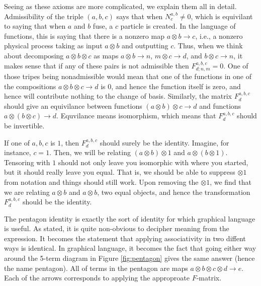 \documentclass{article}
\theoremstyle{definition}
\numberwithin{figure}{section}
\begin{document}
Seeing as these axioms are more complicated, we explain them all in detail. Admissibility of the triple $(a,b,c)$ says that when $N^{a,b}_{c}\neq 0$, which is equivilant to saying that when $a$ and $b$ fuse, a $c$ particle is created. In the language of functions, this is saying that there is a nonzero map $a\otimes b\to c$, i.e., a nonzero physical process taking as input $a\otimes b$ and outputting $c$.  Thus, when we think about decomposing $a\otimes b\otimes c$ as maps $a\otimes b\to n$, $m\otimes c\to d$, and $b\otimes c\to n$, it makes sense that if any of these pairs is not admissible then $F^{a,b,c}_{d;n,m}=0$. One of those tripes being nonadmissible would mean that one of the functions in one of the compositions $a\otimes b\otimes c\to d$ is $0$, and hence the function itself is zero, and hence will contribute nothing to the change of basis. Similarly, the matrix $F^{a,b,c}_{d}$ should give an equivilance between functions $(a\otimes b)\otimes c \to d$ and functions $a\otimes (b\otimes c)\to d$. Equvilance means isomorphism, which means that $F^{a,b,c}_{d}$ should be invertible.

If one of $a,b,c$ is $1$, then $F^{a,b,c}_{d}$ should surely be the identity. Imagine, for instance, $c=1$. Then, we will be relating $(a\otimes b)\otimes 1$ and $a \otimes (b\otimes 1)$. Tensoring with $1$ should not only leave you isomorphic with where you started, but it should really leave you equal. That is, we should be able to suppress $\otimes 1$ from notation and things should still work. Upon removing the $\otimes 1$, we find that we are relating $a\otimes b$ and $a\otimes b$, two equal objects, and hence the transformation $F^{a,b,c}_{d}$ should be the identity.

The pentagon identity is exactly the sort of identity for which graphical language is useful. As stated, it is quite non-obvious to decipher meaning from the expression. It becomes the statement that applying associativity in two diffent ways is identical. In graphical language, it becomes the fact that going either way around the 5-term diagram in Figure \ref{fig:pentagon} gives the same answer (hence the name pentagon). All of terms in the pentagon are maps $a \otimes b\otimes c\otimes d \to e$. Each of the arrows corresponds to applying the approproate $F$-matrix.
\end{document}
